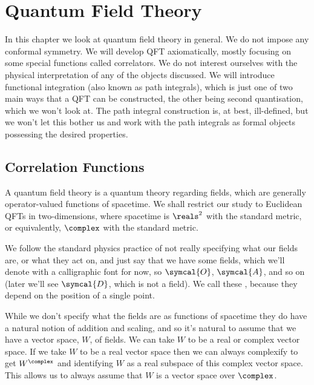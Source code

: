 \documentclass[fleqn]{NotesClass}
\newcommand{\quantumField}[1]{\symcal{#1}}
\newcommand{\DL}{\symcal{D}}
\begin{document}
    \chapter{Quantum Field Theory}
    In this chapter we look at quantum field theory in general.
    We do not impose any conformal symmetry.
    We will develop QFT axiomatically, mostly focusing on some special functions called correlators.
    We do not interest ourselves with the physical interpretation of any of the objects discussed.
    We will introduce functional integration (also known as path integrals), which is just one of two main ways that a QFT can be constructed, the other being second quantisation, which we won't look at.
    The path integral construction is, at best, ill-defined, but we won't let this bother us and work with the path integrals as formal objects possessing the desired properties.
    
    \section{Correlation Functions}
    A quantum field theory is a quantum theory regarding fields, which are generally operator-valued functions of spacetime.
    We shall restrict our study to Euclidean QFTs in two-dimensions, where spacetime is \(\reals^2\) with the standard metric, or equivalently, \(\complex\) with the standard metric.
    
    We follow the standard physics practice of not really specifying what our fields are, or what they act on, and just say that we have some fields, which we'll denote with a calligraphic font for now, so \(\quantumField{O}\), \(\quantumField{A}\), and so on (later we'll see \(\DL\), which is not a field).
    We call these , because they depend on the position of a single point.
    
    While we don't specify what the fields are as functions of spacetime they do have a natural notion of addition and scaling, and so it's natural to assume that we have a vector space, \(W\), of fields.
    We can take \(W\) to be a real or complex vector space.
    If we take \(W\) to be a real vector space then we can always complexify to get \(W^{\complex}\) and identifying \(W\) as a real subspace of this complex vector space.
    This allows us to always assume that \(W\) is a vector space over \(\complex\).
    
\end{document}
